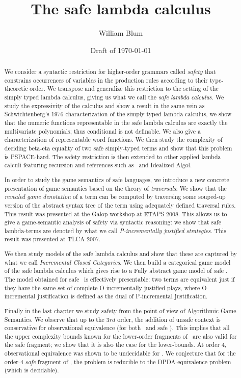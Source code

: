 \documentclass[a4paper,twoside,openright]{ociamthesis}
\author{William Blum}
\title{The safe lambda calculus}
\date{Draft of \today}
\begin{document}
\maketitle

\begin{abstract}
We consider a syntactic restriction for higher-order grammars called \emph{safety}  that  constrains occurrences of variables in the production rules according to their type-theoretic order. We transpose and generalize this restriction to the setting of the simply typed lambda calculus, giving us what we call the \emph{safe lambda calculus}.  We study the expressivity of the calculus and show a result in the same vein as Schwichtenberg's 1976 characterization of the simply typed lambda calculus, we show that the numeric functions representable in the safe lambda calculus are exactly the
multivariate polynomials; thus conditional is not definable. We
also give a characterization of representable word functions.
We then study the complexity of deciding beta-eta equality of two safe simply-typed terms and show that this problem is PSPACE-hard. The safety restriction is then extended to other applied lambda calculi featuring recursion and references such as \pcf\ and Idealized Algol.

In order to study the game semantics of safe languages, we introduce a new concrete presentation of game semantics based on the theory of \emph{traversals}: We show that the \emph{revealed game denotation} of a term can be computed by traversing some souped-up version of the abstract syntax tree of the term using adequately defined traversal rules. This result was presented at the Galop workshop at ETAPS 2008. This allows us to give a game-semantic analysis of safety via syntactic reasoning: we show that safe lambda-terms are denoted by what we call \emph{P-incrementally justified strategies}. This result was presented at TLCA 2007.

We then study models of the safe lambda calculus and show that these are captured by what we call \emph{Incremental Closed Categories}. We then build a categorical game model of the safe lambda calculus which gives rise to a Fully abstract game model of safe \ialgol.
The model obtained for safe \ialgol\ is effectively presentable: two terms are equivalent just if they have the same set of complete O-incrementally justified plays, where O-incremental justification is defined as the dual of P-incremental justification.

Finally in the last chapter we study safety from the point of view of Algorithmic Game Semantics.  We observe that up to the $3rd$ order, the addition of unsafe context is conservative for observational equivalence (for both \ialgol\ and safe \ialgol). This implies that all the upper complexity bounds known for the lower-order fragments of \ialgol\ are also valid for the safe fragment; we show that it is also the case for the lower-bounds. At order $4$, observational equivalence was shown to be undecidable for \ialgol.
We conjecture that for the order-$4$ \emph{safe} fragment of \ialgol, the problem is reducible to the DPDA-equivalence problem (which is decidable).


\end{abstract}
\end{document}

